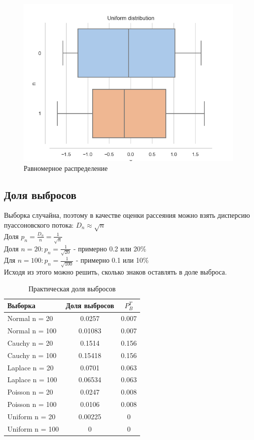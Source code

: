 \documentclass[a4paper,14pt]{article}
\begin{document}
	\begin{figure}[H]
		\centering
		\includegraphics[scale=0.6]{../image/lab3/lab3_uniform.png}
		\caption{Равномерное распределение}
		\label{fig:uniform}
	\end{figure}
	\subsection{Доля выбросов}
	Выборка случайна, поэтому в качестве оценки рассеяния можно взять дисперсию пуассоновского потока:  $D_n \approx \sqrt{n}$\\
	Доля $p_n = \frac{D_n}{n}=\frac{1}{\sqrt{n}}$\\
	Доля $n=20: p_n=\frac{1}{\sqrt{20}}$ - примерно 0.2 или 20\% \\
	Для $n=100: p_n=\frac{1}{\sqrt{100}}$ - примерно 0.1 или 10\% \\
	Исходя из этого можно решить, сколько знаков оставлять в доле выброса.
	
	\begin{table}[H]
		\centering
		\begin{tabular}{|l|c|c|}
			\hline
			Выборка & Доля выбросов	& $P^T_B$\\\hline
			\hline
			Normal n = 20 & 0.0257 & 0.007\\\hline
			Normal n = 100 & 0.01083 & 0.007\\\hline
			Cauchy n = 20 & 0.1514 & 0.156\\\hline
			Cauchy n = 100 & 0.15418 & 0.156\\\hline
			Laplace n = 20 & 0.0701 & 0.063\\\hline
			Laplace n = 100 & 0.06534 & 0.063\\\hline
			Poisson n = 20 & 0.0247 & 0.008\\\hline
			Poisson n = 100 & 0.0106 & 0.008\\\hline
			Uniform n = 20 & 0.00225 & 0\\\hline
			Uniform n = 100 & 0 & 0\\\hline
		\end{tabular}
		\caption{Практическая доля выбросов}
	\end{table}
\end{document}
